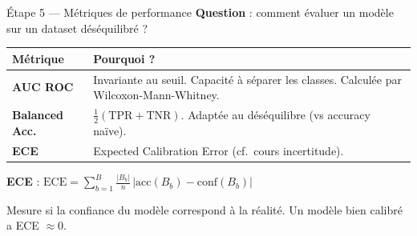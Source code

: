 \documentclass[aspectratio=169, 11pt]{beamer}
\begin{document}
\begin{frame}{\'Etape 5 --- M\'etriques de performance}
\textbf{Question} : comment \'evaluer un mod\`ele sur un dataset d\'es\'equilibr\'e ?

\vspace{0.5em}
\small
\begin{tabular}{lp{10cm}}
\toprule
\textbf{M\'etrique} & \textbf{Pourquoi ?} \\
\midrule
\textbf{AUC ROC} & Invariante au seuil. Capacit\'e \`a s\'eparer les classes. Calcul\'ee par Wilcoxon-Mann-Whitney. \\
\textbf{Balanced Acc.} & $\frac{1}{2}(\text{TPR}+\text{TNR})$. Adapt\'ee au d\'es\'equilibre (vs accuracy na\"ive). \\
\textbf{ECE} & Expected Calibration Error (cf.~cours incertitude). \\
\bottomrule
\end{tabular}

\vspace{0.5em}
\normalsize
\textbf{ECE} : $\displaystyle\text{ECE} = \sum_{b=1}^{B} \frac{|B_b|}{n}\, \big|\text{acc}(B_b) - \text{conf}(B_b)\big|$

\vspace{0.2em}
\small Mesure si la confiance du mod\`ele correspond \`a la r\'ealit\'e.
Un mod\`ele bien calibr\'e a ECE $\approx 0$.
\end{frame}
\end{document}
